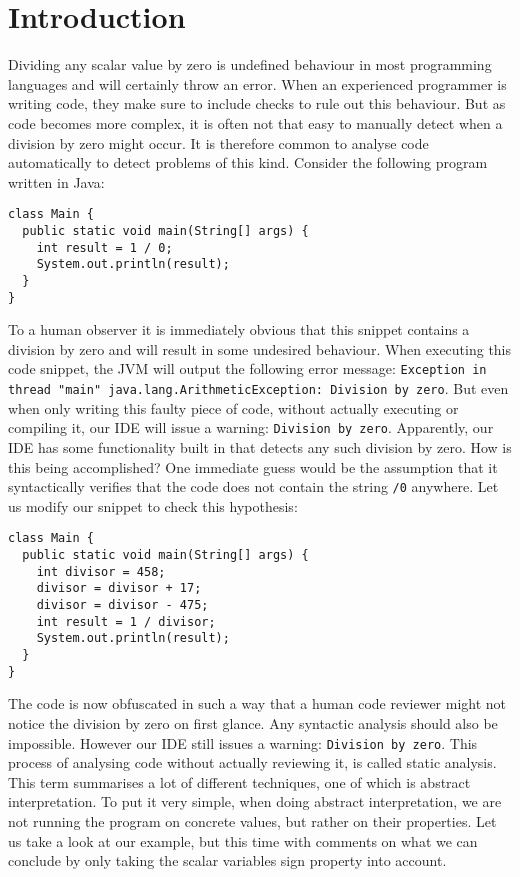 \chapter{Introduction}


%
%


Dividing any scalar value by zero is undefined behaviour in most programming languages and will certainly throw an error. When an experienced programmer is writing code, they make sure to include checks to rule out this behaviour. But as code becomes more complex, it is often not that easy to manually detect when a division by zero might occur. It is therefore common to analyse code automatically to detect problems of this kind. Consider the following program written in Java:


\begin{center}
\begin{BVerbatim}
class Main {
  public static void main(String[] args) {
    int result = 1 / 0;
    System.out.println(result);
  }
}
\end{BVerbatim}
\end{center}

\noindent To a human observer it is immediately obvious that this snippet contains a division by zero and will result in some undesired behaviour. When executing this code snippet, the JVM will output the following error message: \texttt{Exception in thread "main" java.lang.ArithmeticException: Division by zero}. But even when only writing this faulty piece of code, without actually executing or compiling it, our IDE will issue a warning: \texttt{Division by zero}. Apparently, our IDE has some functionality built in that detects any such division by zero. How is this being accomplished? One immediate guess would be the assumption that it syntactically verifies that the code does not contain the string \texttt{/0} anywhere. Let us modify our snippet to check this hypothesis:

 \begin{center}
\begin{BVerbatim}
class Main {
  public static void main(String[] args) {
    int divisor = 458;
    divisor = divisor + 17;
    divisor = divisor - 475;
    int result = 1 / divisor;
    System.out.println(result);
  }
}
\end{BVerbatim}
\end{center}

\noindent The code is now obfuscated in such a way that a human code reviewer might not notice the division by zero on first glance. Any syntactic analysis should also be impossible. However our IDE still issues a warning: \texttt{Division by zero}. This process of analysing code without actually reviewing it, is called static analysis. This term summarises a lot of different techniques, one of which is abstract interpretation.
To put it very simple, when doing abstract interpretation, we are not running the program on concrete values, but rather on their properties. Let us take a look at our example, but this time with comments on what we can conclude by only taking the scalar variables sign property into account.  


